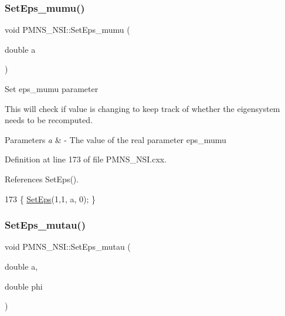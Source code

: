 \subsubsection{\texorpdfstring{Set\+Eps\+\_\+mumu()}{SetEps\_mumu()}}
{\footnotesize\ttfamily void P\+M\+N\+S\+\_\+\+N\+S\+I\+::\+Set\+Eps\+\_\+mumu (\begin{DoxyParamCaption}\item[{double}]{a }\end{DoxyParamCaption})\hspace{0.3cm}{\ttfamily [virtual]}}

Set eps\+\_\+mumu parameter

This will check if value is changing to keep track of whether the eigensystem needs to be recomputed.


\begin{DoxyParams}{Parameters}
{\em a} & -\/ The value of the real parameter eps\+\_\+mumu \\
\hline
\end{DoxyParams}


Definition at line 173 of file P\+M\+N\+S\+\_\+\+N\+S\+I.\+cxx.



References Set\+Eps().


\begin{DoxyCode}
173 \{ \hyperlink{classOscProb_1_1PMNS__NSI_a87c508149ea36b6de493a6817247a0ea}{SetEps}(1,1, a, 0); \}
\end{DoxyCode}
\mbox{\label{classOscProb_1_1PMNS__NSI_acfb9893697e04fcc25915ffaf8ed137f}} 
\subsubsection{\texorpdfstring{Set\+Eps\+\_\+mutau()}{SetEps\_mutau()}}
{\footnotesize\ttfamily void P\+M\+N\+S\+\_\+\+N\+S\+I\+::\+Set\+Eps\+\_\+mutau (\begin{DoxyParamCaption}\item[{double}]{a,  }\item[{double}]{phi }\end{DoxyParamCaption})\hspace{0.3cm}{\ttfamily [virtual]}}

